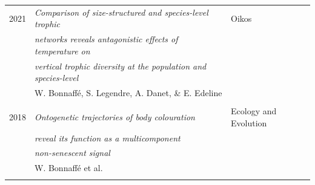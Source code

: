 \documentclass[11pt, oneside]{article}   	%
\begin{document}
\begin{tabular}{rll}
\\
2021 & \textit{Comparison of size-structured and species-level trophic} & Oikos \\ 
& \textit{networks reveals antagonistic effects of temperature on} & \\
& \textit{vertical trophic diversity at the population and species-level} & \\
& W. Bonnaff\'e, S. Legendre, A. Danet, \& E. Edeline & \\
\\
2018 & \textit{Ontogenetic trajectories of body colouration} & Ecology and Evolution \\ 
& \textit{reveal its function as a multicomponent} & \\
& \textit{non-senescent signal} &  \\
& W. Bonnaff\'e et al. \\
\\
\end{tabular}
\end{document}
